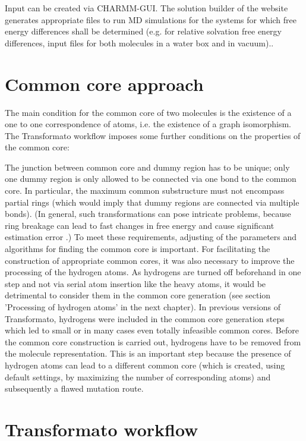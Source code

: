 Input can be created via CHARMM-GUI\cite{Jo.2008}. The solution builder of the website generates appropriate files to run MD simulations for the systems for which free energy differences shall be determined (e.g. for relative solvation free energy differences, input files for both molecules in a water box and in vacuum).\cite{Braunsfeld.}\cite{Karwounopoulos.2022}.

\section{Common core approach}

The main condition for the common core of two molecules is the existence
of a one to one correspondence of atoms, i.e. the existence of a graph
isomorphism. The Transformato workflow imposes some further conditions
on the properties of the common core:

The junction between common core and dummy region has to be unique;
only one dummy region is only allowed to be connected via one bond to the
common core. In particular, the maximum common substructure must not
encompass partial rings (which would imply that dummy regions are
connected via multiple bonds). (In general, such transformations can pose intricate problems, because ring breakage can lead to fast changes in free energy
and cause significant estimation error \cite{Liu.2015}.)
To meet these requirements, adjusting of the parameters and algorithms for finding the common core is important. For facilitating the construction of appropriate common cores, it was also necessary to improve the processing of the hydrogen atoms. As hydrogens are turned off beforehand in one step and not via serial atom insertion like the heavy atoms, it would be  detrimental to consider them in the common core generation (see section 'Processing of hydrogen atoms' in the next chapter). In previous versions of Transformato, hydrogens were included in the common core generation steps which led to small or in many cases even totally infeasible common cores. Before the common core construction is carried out, hydrogens have to be
removed from the molecule representation. This is an important step
because the presence of hydrogen atoms can lead to a different common
core (which is created, using default settings, by maximizing the
number of corresponding atoms) and subsequently a flawed mutation
route. 




\section{Transformato workflow}



